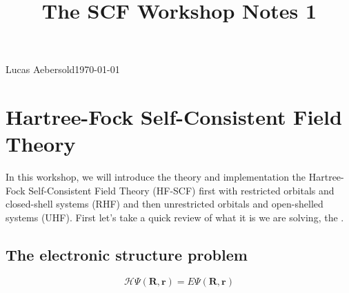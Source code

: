 \documentclass[11pt]{article}
\begin{document}
\title{The SCF Workshop Notes 1}{Lucas Aebersold}{\today}

\section{Hartree-Fock Self-Consistent Field Theory}
In this workshop, we will introduce the theory and implementation the Hartree-Fock Self-Consistent Field Theory (HF-SCF) first with restricted orbitals and closed-shell systems (RHF) and then unrestricted orbitals and open-shelled systems (UHF). First let's take a quick review of what it is we are solving, the \SE{}. 
\subsection{The electronic structure problem}
\begin{equation}
\mathscr{H} \Psi(\textbf{R},\textbf{r})= E \Psi(\textbf{R},\textbf{r})
\end{equation}
\end{document}
